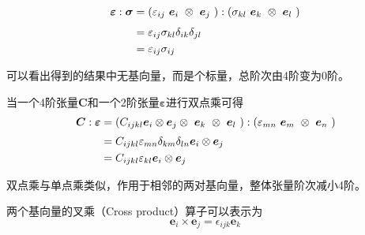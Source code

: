 \begin{equation}
    \begin{split}
        \boldsymbol \varepsilon : \boldsymbol \sigma &= (\varepsilon_{ij} \tikzmark{e11}{$\boldsymbol e_i$} \otimes \tikzmark{e12}{$\boldsymbol e_j$}):(\sigma_{kl} \tikzmark{e13}{$\boldsymbol e_k$} \otimes \tikzmark{e14}{$\boldsymbol e_l$}) \\
                                                     &= \varepsilon_{ij} \sigma_{kl} \delta_{ik} \delta_{jl} \\
                                                     &= \varepsilon_{ij} \sigma_{ij}
    \end{split}
\end{equation}
可以看出得到的结果中无基向量，而是个标量，总阶次由4阶变为0阶。\par
当一个4阶张量$\boldsymbol C$和一个2阶张量$\boldsymbol \varepsilon$进行双点乘可得
\begin{equation}
    \begin{split}
        \boldsymbol C : \boldsymbol \varepsilon &= (C_{ijkl} \boldsymbol e_i \otimes \boldsymbol e_j \otimes \tikzmark{e21}{$\boldsymbol e_k$} \otimes \tikzmark{e22}{$\boldsymbol e_l$}) : (\varepsilon_{mn} \tikzmark{e23}{$\boldsymbol e_m$} \otimes \tikzmark{e24}{$\boldsymbol e_n$}) \\
                                                &= C_{ijkl} \varepsilon_{mn} \delta_{km} \delta_{ln} \boldsymbol e_i \otimes \boldsymbol e_j \\
                                                &= C_{ijkl} \varepsilon_{kl} \boldsymbol e_i \otimes \boldsymbol e_j
    \end{split}
\end{equation}
双点乘与单点乘类似，作用于相邻的两对基向量，整体张量阶次减小4阶。\par
两个基向量的叉乘（Cross product）算子可以表示为
\begin{equation}
    \boldsymbol e_i \times \boldsymbol e_j = \epsilon_{ijk} \boldsymbol e_k
\end{equation}
